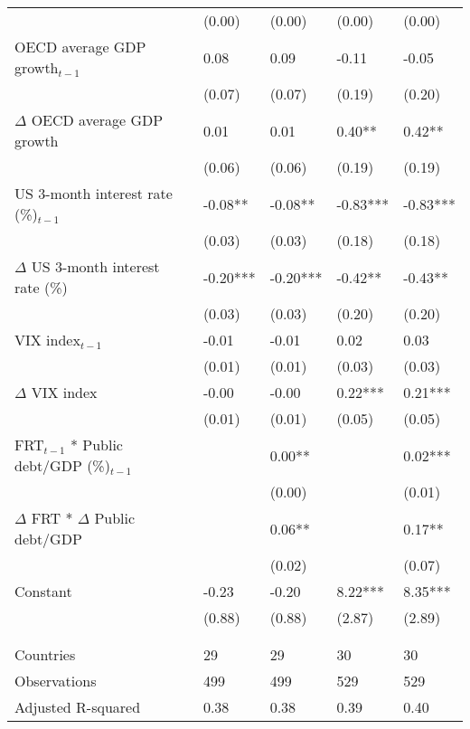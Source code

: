 \begin{tabular}{lp{3cm}p{3cm}p{3cm}p{3cm}}
   & (0.00) & (0.00) & (0.00) & (0.00) \\ 
  OECD average GDP growth$_{t-1}$ & 0.08 & 0.09 & -0.11 & -0.05 \\ 
   & (0.07) & (0.07) & (0.19) & (0.20) \\ 
  $\Delta$ OECD average GDP growth & 0.01 & 0.01 & 0.40** & 0.42** \\ 
   & (0.06) & (0.06) & (0.19) & (0.19) \\ 
  US 3-month interest rate (\%)$_{t-1}$ & -0.08** & -0.08** & -0.83*** & -0.83*** \\ 
   & (0.03) & (0.03) & (0.18) & (0.18) \\ 
  $\Delta$ US 3-month interest rate (\%) & -0.20*** & -0.20*** & -0.42** & -0.43** \\ 
   & (0.03) & (0.03) & (0.20) & (0.20) \\ 
  VIX index$_{t-1}$ & -0.01 & -0.01 & 0.02 & 0.03 \\ 
   & (0.01) & (0.01) & (0.03) & (0.03) \\ 
  $\Delta$ VIX index & -0.00 & -0.00 & 0.22*** & 0.21*** \\ 
   & (0.01) & (0.01) & (0.05) & (0.05) \\ 
  FRT$_{t-1}$ * Public debt/GDP (\%)$_{t-1}$ &  & 0.00** &  & 0.02*** \\ 
   &  & (0.00) &  & (0.01) \\ 
  $\Delta$ FRT * $\Delta$ Public debt/GDP &  & 0.06** &  & 0.17** \\ 
   &  & (0.02) &  & (0.07) \\ 
  Constant & -0.23 & -0.20 & 8.22*** & 8.35*** \\ 
   & (0.88) & (0.88) & (2.87) & (2.89) \\ 
   &  &  &  &  \\ 
   &  &  &  &  \\ 
  Countries & 29 & 29 & 30 & 30 \\ 
  Observations & 499 & 499 & 529 & 529 \\ 
  Adjusted R-squared & 0.38 & 0.38 & 0.39 & 0.40 \\ 
   \hline
\end{tabular}
\endgroup
